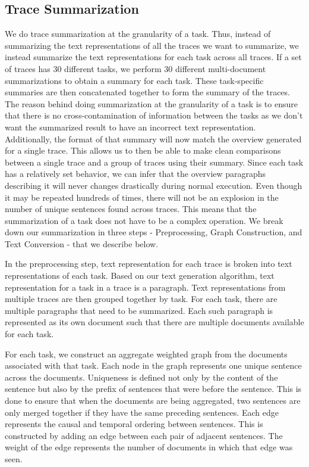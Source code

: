 \subsection{Trace Summarization}

We do trace summarization at the granularity of a task. Thus, instead of summarizing the text representations of all the traces we want to summarize,
we instead summarize the text representations for each task across all traces. If a set of traces has 30 different tasks,
we perform 30 different multi-document summarizations to obtain a summary for each task. These task-specific summaries
are then concatenated together to form the summary of the traces.
The reason behind doing summarization at the granularity of a task is to ensure that there is no cross-contamination
of information between the tasks as we don't want the summarized result to have an incorrect text representation.
Additionally, the format of that summary will now match the overview generated for a
single trace. This allows us to then be able to make clean comparisons between a single trace and a group of traces using their summary.
Since each task has a relatively set behavior,
we can infer that the overview paragraphs describing it will never changes drastically during normal execution. Even though it may be repeated hundreds of times, 
there will not be an explosion in the number of unique sentences found across traces. This means that the 
summarization of a task does not have to be a complex operation.
We break down our summarization in three steps - Preprocessing, Graph Construction, and Text Conversion - that we describe below.

 In the preprocessing step, text representation for each trace is broken into text representations of each
task. Based on our text generation algorithm, text representation for a task in a trace is a paragraph.
Text representations from multiple traces are then grouped together by task. For each task, there are multiple
paragraphs that need to be summarized. Each such paragraph is represented as its own document such that
there are multiple documents available for each task.

 For each task, we construct an aggregate weighted graph from the documents associated with that task.
Each node in the graph represents one unique sentence across the documents. Uniqueness is defined not only by the content
of the sentence but also by the prefix of sentences that were before the sentence. This is done to ensure that
when the documents are being aggregated, two sentences are only merged together if they have the same preceding
sentences. Each edge represents the causal and temporal ordering between sentences. This is constructed by adding
an edge between each pair of adjacent sentences. The weight of the edge represents the number of documents in
which that edge was seen.

